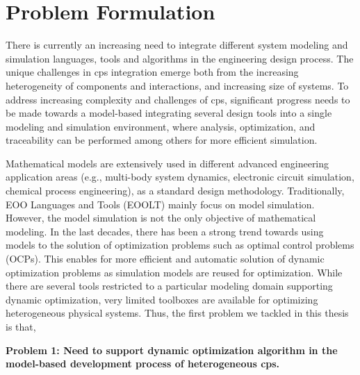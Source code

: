 \section{Problem Formulation}
\label{sec:Problem Formulation}

There is currently an increasing need to integrate different system modeling and simulation languages, tools and algorithms in the engineering design process. The unique challenges in \acrshort{cps} integration emerge both from the increasing heterogeneity of components and interactions, and increasing size of systems. To address increasing complexity and challenges of \acrshort{cps}, significant progress needs to be made towards a model-based integrating several design tools into a single modeling and simulation environment, where analysis, optimization, and traceability can be performed among others for more efficient simulation.

Mathematical models are extensively used in different advanced engineering application areas (e.g., multi-body system dynamics, electronic circuit simulation, chemical process engineering), as a standard design methodology. Traditionally, EOO Languages and Tools (EOOLT) mainly focus on model simulation. However, the model simulation is not the only objective of mathematical modeling. In the last decades, there has been a strong trend towards using models to the solution of optimization problems such as optimal control problems (OCPs). This enables for more efficient and automatic solution of dynamic optimization problems as simulation models are reused for optimization. While there are several tools restricted to a particular modeling domain supporting dynamic optimization, very limited toolboxes are available for optimizing heterogeneous physical systems. Thus, the first problem we tackled in this thesis is that, 

\begin{description}
	
\item \textbf{Problem 1: Need to support dynamic optimization algorithm in the model-based development process of heterogeneous \acrshort{cps}.}

\end{description}

